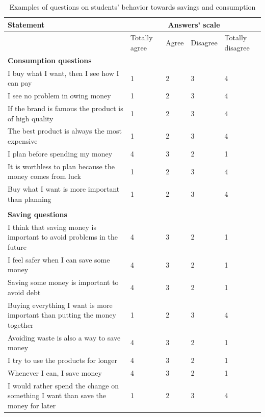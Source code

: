 \documentclass[
	article,			%
	12pt,				%
	oneside,			%
	a4paper,			%
	]{article}
\begin{document}
\begin{table}[h!]
  \centering
  \fontsize{8}{10} \selectfont
  \caption{Examples of questions on students' behavior towards savings and consumption}
     \begin{tabular}{lllll}
    \textbf{Statement} & \multicolumn{4}{c}{\textbf{Answers' scale}} \\
    \midrule
          & Totally agree & Agree & Disagree & Totally disagree \\
    \textbf{Consumption questions} &       &       &       &  \\
    I buy what I want, then I see how I can pay & 1     & 2     & 3     & 4 \\
    I see no problem in owing money & 1     & 2     & 3     & 4 \\
    If the brand is famous the product is of high quality & 1     & 2     & 3     & 4 \\
    The best product is always the most expensive & 1     & 2     & 3     & 4 \\
    I plan before spending my money & 4     & 3     & 2     & 1 \\
    It is worthless to plan because the money comes from luck & 1     & 2     & 3     & 4 \\
    Buy what I want is more important than  planning & 1     & 2     & 3     & 4 \\
          &       &       &       &  \\
    \textbf{Saving questions} &       &       &       &  \\
    I think that saving money is important to avoid problems in the future & 4     & 3     & 2     & 1 \\
    I feel safer when I can save some money & 4     & 3     & 2     & 1 \\
    Saving some money is important to avoid debt & 4     & 3     & 2     & 1 \\
    Buying everything I want is more important than putting the money together & 1     & 2     & 3     & 4 \\
    Avoiding waste is also a way to save money & 4     & 3     & 2     & 1 \\
    I try to use the products for longer & 4     & 3     & 2     & 1 \\
    Whenever I can, I save money & 4     & 3     & 2     & 1 \\
    I would rather spend the change on something I want than save the money for later & 1     & 2     & 3     & 4 \\
    \bottomrule
    \end{tabular}%
  \label{tab:cs_index}%
\end{table}%
\end{document}

